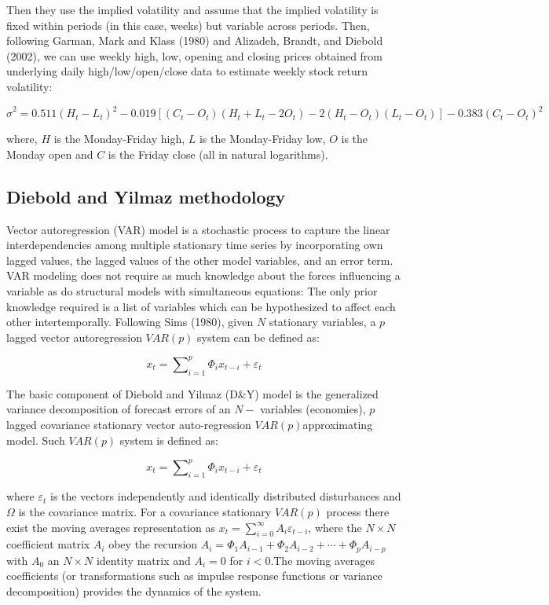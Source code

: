 \documentclass[]{elsarticle} %
\begin{document}
Then they use the implied volatility and assume that the implied
volatility is fixed within periods (in this case, weeks) but variable
across periods. Then, following Garman, Mark and Klass (1980) and
Alizadeh, Brandt, and Diebold (2002), we can use weekly high, low,
opening and closing prices obtained from underlying daily
high/low/open/close data to estimate weekly stock return volatility:

\[{{\hat{\sigma }}^{2}}=0.511{{\left( {{H}_{t}}-{{L}_{t}} \right)}^{2}}-0.019\left[ \left( {{C}_{t}}-{{O}_{t}} \right)\left( {{H}_{t}}+{{L}_{t}}-2{{O}_{t}} \right)-2\left( {{H}_{t}}-{{O}_{t}} \right)\left( {{L}_{t}}-{{O}_{t}} \right) \right]-0.383{{\left( {{C}_{t}}-{{O}_{t}} \right)}^{2}}\]

where, \(H\) is the Monday-Friday high, \(L\) is the Monday-Friday low,
\(O\) is the Monday open and \(C\) is the Friday close (all in natural
logarithms).

\subsection{Diebold and Yilmaz
methodology}\label{diebold-and-yilmaz-methodology}

Vector autoregression (VAR) model is a stochastic process to capture the
linear interdependencies among multiple stationary time series by
incorporating own lagged values, the lagged values of the other model
variables, and an error term. VAR modeling does not require as much
knowledge about the forces influencing a variable as do structural
models with simultaneous equations: The only prior knowledge required is
a list of variables which can be hypothesized to affect each other
intertemporally. Following Sims (1980), given \(N\) stationary
variables, a \(p\) lagged vector autoregression \(VAR\left( p \right)\)
system can be defined as:

\[{{x}_{t}}=\sum\nolimits_{i=1}^{p}{{{\Phi }_{i}}{{x}_{t-i}}+{{\varepsilon }_{t}}}\]

The basic component of Diebold and Yilmaz (D\&Y) model is the
generalized variance decomposition of forecast errors of an \(N-\)
variables (economies), \(p\) lagged covariance stationary vector
auto-regression \(VAR\left( p \right)\)approximating model. Such
\(VAR\left( p \right)\) system is defined as:

\[{{x}_{t}}=\sum\nolimits_{i=1}^{p}{{{\Phi }_{i}}{{x}_{t-i}}+{{\varepsilon }_{t}}}\]

where \({{\varepsilon }_{t}}\) is the vectors independently and
identically distributed disturbances and \(\Omega\) is the covariance
matrix. For a covariance stationary \(VAR\left( p \right)\) process
there exist the moving averages representation as
\({{x}_{t}}=\sum\nolimits_{i=0}^{\infty }{{{A}_{i}}{{\varepsilon }_{t-i}}}\),
where the \(N\times N\) coefficient matrix \({{A}_{i}}\) obey the
recursion
\({{A}_{i}}={{\Phi }_{1}}{{A}_{i-1}}+{{\Phi }_{2}}{{A}_{i-2}}+\cdots +{{\Phi }_{p}}{{A}_{i-p}}\)
with \({{A}_{0}}\) an \(N\times N\) identity matrix and \({{A}_{i}}=0\)
for \(i<0\).The moving averages coefficients (or transformations such as
impulse response functions or variance decomposition) provides the
dynamics of the system.
\end{document}
